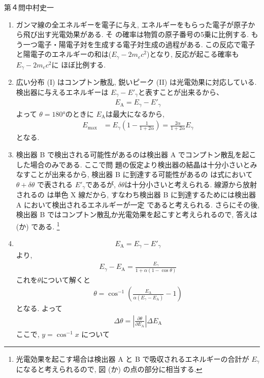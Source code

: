 \begin{answer}{第４問}{中村史一}
\begin{enumerate}
\item
  ガンマ線の全エネルギーを電子に与え, エネルギーをもらった電子が原子から飛び出す光電効果がある. そ
  の確率は物質の原子番号の5乗に比例する. もう一つ電子・陽電子対を生成する電子対生成の過程がある. 
  この反応で電子と陽電子のエネルギーの和は($E_\gamma-2m_ec^2$)となり, 反応が起こる確率も$E_\gamma-2m_ec^2$に
  ほぼ比例する. 
\item
  広い分布 (I) はコンプトン散乱, 鋭いピーク (II) は光電効果に対応している. 検出器に与えるエネルギーは
  $E_\gamma-E'_\gamma$と表すことが出来るから、
  \begin{align}
    E_\mathrm{A}=E_\gamma-E'_\gamma
  \end{align}
  よって $\theta=180$°のときに $E_\mathrm{A}$は最大になるから, 
  \begin{align}
    E_\mathrm{max} &= E_\gamma \left(1-\frac1{1+2\alpha}\right) = \frac{2\alpha}{1+2\alpha}E_\gamma
  \end{align}
  となる. 
\item
  検出器 B で検出される可能性があるのは検出器 A でコンプトン散乱を起こした場合のみである. ここで問
  題の仮定より検出器の結晶は十分小さいとみなすことが出来るから, 検出器 B に到達する可能性があるの
  は式において $\theta+\delta\theta$ で表される $E'_\gamma$であるが, $\delta\theta$は十分小さいと考えられる. 線源から放射されるの
  は単色 X 線だから, すなわち検出器 B に到達するためには検出器 A において検出されるエネルギーが一定
  であると考えられる. さらにその後, 検出器 B ではコンプトン散乱か光電効果を起こすと考えられるので, 
  答えは (か) である. \footnote{
  光電効果を起こす場合は検出器 A と B で吸収されるエネルギーの合計が $E_\gamma$ になると考えられるので, 図 (か) の点の部分に相当する. }
\item
  \begin{align}
    E_\mathrm{A}= E_\gamma - E'_\gamma
  \end{align}
  より, 
  \begin{align}
    E_\gamma -E_\mathrm{A} = \frac{E_\gamma}{1+\alpha(1-\cos\theta)}
  \end{align}
  これを$\theta$について解くと
  \begin{align}
    \theta=\cos^{-1}\left(\frac{E_\mathrm{A}}{\alpha(E_\gamma-E_\mathrm{A})}-1\right)
  \end{align}
  となる. よって
  \begin{align}
    \Delta \theta=\left|\frac{\partial \theta}{\partial E_\mathrm{A}}\right| \Delta E_\mathrm{A}
  \end{align}
  ここで, $y=\cos^{-1}x$ について

\end{enumerate}
\end{answer}
